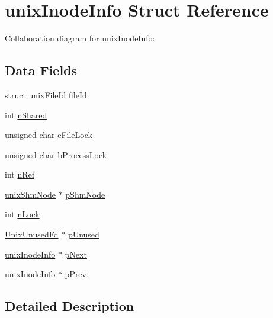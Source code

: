 \hypertarget{structunix_inode_info}{}\section{unix\+Inode\+Info Struct Reference}
\label{structunix_inode_info}


Collaboration diagram for unix\+Inode\+Info\+:
\subsection*{Data Fields}
\begin{DoxyCompactItemize}
\item 
struct \hyperlink{structunix_file_id}{unix\+File\+Id} \hyperlink{structunix_inode_info_a90d68cb51e9a69f9fca055fe70a066e4}{file\+Id}
\item 
int \hyperlink{structunix_inode_info_ad9aa6b43edcb95edb5edb57db88deb6e}{n\+Shared}
\item 
unsigned char \hyperlink{structunix_inode_info_a074528e86f4417f8c3ce538e07908824}{e\+File\+Lock}
\item 
unsigned char \hyperlink{structunix_inode_info_a914e97ae932a15853079b35b212d870e}{b\+Process\+Lock}
\item 
int \hyperlink{structunix_inode_info_a3c459f9ae278c22b72583c55ca01acb7}{n\+Ref}
\item 
\hyperlink{structunix_shm_node}{unix\+Shm\+Node} $\ast$ \hyperlink{structunix_inode_info_a33d94caf6216ac0179eaf8fc02bc0237}{p\+Shm\+Node}
\item 
int \hyperlink{structunix_inode_info_a8928c430237c0a4baca86f43854c0649}{n\+Lock}
\item 
\hyperlink{struct_unix_unused_fd}{Unix\+Unused\+Fd} $\ast$ \hyperlink{structunix_inode_info_a7ecad57bed967765906dd7d10af97be1}{p\+Unused}
\item 
\hyperlink{structunix_inode_info}{unix\+Inode\+Info} $\ast$ \hyperlink{structunix_inode_info_ab9be30e7413abc800209febcd123d889}{p\+Next}
\item 
\hyperlink{structunix_inode_info}{unix\+Inode\+Info} $\ast$ \hyperlink{structunix_inode_info_a0d29ce137f0370c2b19132ab0adeb178}{p\+Prev}
\end{DoxyCompactItemize}


\subsection{Detailed Description}


